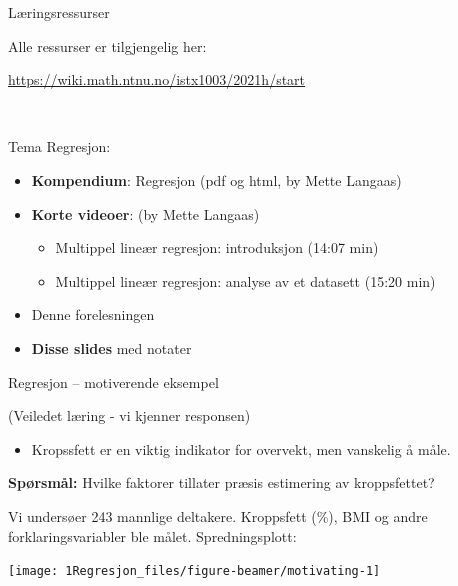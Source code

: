 \documentclass[10pt,ignorenonframetext,]{beamer}
\providecommand{\tightlist}{%
  \setlength{\itemsep}{0pt}\setlength{\parskip}{0pt}}
\begin{document}
\begin{frame}{Læringsressurser}
\protect\hypertarget{luxe6ringsressurser}{}

\vspace{2mm}

Alle ressurser er tilgjengelig her:

\url{https://wiki.math.ntnu.no/istx1003/2021h/start}

\(~\)

Tema Regresjon:

\vspace{2mm}

\begin{itemize}
\item
  \textbf{Kompendium}: Regresjon (pdf og html, by Mette Langaas)
\item
  \textbf{Korte videoer}: (by Mette Langaas)

  \begin{itemize}
  \tightlist
  \item
    Multippel lineær regresjon: introduksjon (14:07 min)
  \item
    Multippel lineær regresjon: analyse av et datasett (15:20 min)
  \end{itemize}
\item
  Denne forelesningen
\item
  \textbf{Disse slides} med notater
\end{itemize}

\end{frame}

\begin{frame}{Regresjon -- motiverende eksempel}
\protect\hypertarget{regresjon-motiverende-eksempel}{}

\centering\tiny(Veiledet læring - vi kjenner responsen)

\vspace{2mm}

\flushleft
\normalsize

\begin{itemize}
\tightlist
\item
  Kropssfett er en viktig indikator for overvekt, men vanskelig å måle.
\end{itemize}

\vspace{2mm}

\textbf{Spørsmål:} Hvilke faktorer tillater præsis estimering av
kroppsfettet?

\vspace{2mm}

Vi undersøer 243 mannlige deltakere. Kroppsfett (\%), BMI og andre
forklaringsvariabler ble målet. Spredningsplott:

\begin{center}\texttt{[image: 1Regresjon\_files/figure-beamer/motivating-1]} \end{center}

\end{frame}
\end{document}
